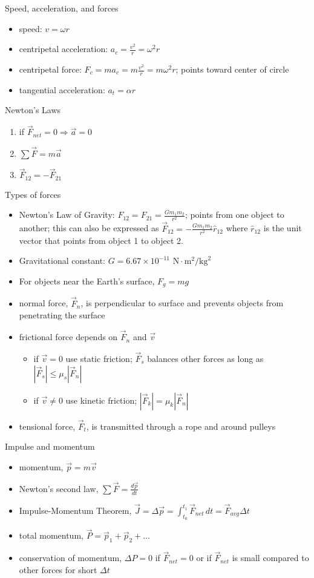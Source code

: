 \documentclass[11pt,letterpaper]{article}
\begin{document}
\clearpage
\noindent Speed, acceleration, and forces
\begin{itemize}
\item speed: $v=\omega{r}$
\item centripetal acceleration: $a_c=\displaystyle\frac{v^2}{r}=\omega^2r$
\item centripetal force: $F_c=ma_c=m\displaystyle\frac{v^2}{r}=m\omega^2r$; points toward center of circle
\item tangential acceleration: $a_t=\alpha{r}$
\end{itemize}
Newton's Laws
\begin{enumerate}
\item if $\vec{F}_{net}=0\Rightarrow \vec{a}=0$
\item $\displaystyle\sum\vec{F}=m\vec{a}$
\item $\vec{F}_{12}=-\vec{F}_{21}$
\end{enumerate}
Types of forces
\begin{itemize}
\item Newton's Law of Gravity: $F_{12}=F_{21}=\displaystyle\frac{Gm_1m_2}{r^2}$; points from one object to another; this can also be expressed as $\vec{F}_{12}=\displaystyle-\frac{Gm_1m_2}{r^2}\hat{r}_{12}$ where $\hat{r}_{12}$ is the unit vector that points from object 1 to object 2.
\item Gravitational constant: $G=6.67\times{10}^{-11}\mbox{ N}\cdot\mbox{m}^2/\mbox{kg}^2$
\item For objects near the Earth's surface, $F_g=mg$
\item normal force, $\vec{F}_n$, is perpendicular to surface and prevents objects from penetrating the surface
\item frictional force depends on $\vec{F}_n$ and $\vec{v}$
\begin{itemize}
\item if $\vec{v}=0$ use static friction; $\vec{F}_s$ balances other forces as long as $\left|\vec{F}_s\right|\leq\mu_s\left|\vec{F}_n\right|$
\item if $\vec{v}\neq{0}$ use kinetic friction; $\left|\vec{F}_k\right|=\mu_k\left|\vec{F}_n\right|$
\end{itemize}
\item tensional force, $\vec{F}_t$, is transmitted through a rope and around pulleys
\end{itemize}
Impulse and momentum
\begin{itemize}
\item momentum, $\vec{p}=m\vec{v}$
\item Newton's second law, $\displaystyle\sum\vec{F}=\displaystyle\frac{d\vec{p}}{dt}$
\item Impulse-Momentum Theorem, $\vec{J}=\Delta{\vec{p}}=\displaystyle\int_{t_0}^{t_1}\vec{F}_{net}\,dt=\vec{F}_{avg}\Delta{t}$
\item total momentum, $\vec{P}=\vec{p}_1+\vec{p}_2+...$
\item conservation of momentum, $\Delta{P}=0$ if $\vec{F}_{net}=0$ or if $\vec{F}_{net}$ is small compared to other forces for short $\Delta{t}$
\end{itemize}
\end{document}
